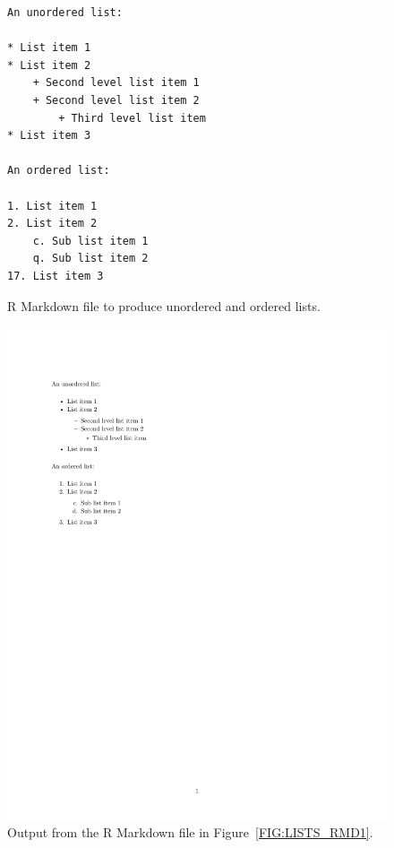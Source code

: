 \documentclass[12pt,oneside]{book}\usepackage[]{graphicx}\usepackage[]{color}
\begin{document}
\begin{figure}[!ht]
\centering
\begin{minipage}{0.45\textwidth}
\centering
\begin{verbatim}
An unordered list:

* List item 1
* List item 2
    + Second level list item 1
    + Second level list item 2
        + Third level list item
* List item 3

An ordered list:

1. List item 1
2. List item 2
    c. Sub list item 1
    q. Sub list item 2
17. List item 3
\end{verbatim}
\caption{R Markdown file to produce unordered and ordered lists.}
\label{FIG:LISTS_RMD1}
\end{minipage}\hfill
\begin{minipage}{0.45\textwidth}
\centering
\includegraphics{03-rMarkdown/03-images/ListExamples.pdf}
\caption{Output from the R Markdown file in Figure~\ref{FIG:LISTS_RMD1}.}
\label{FIG:LISTS_RMD2}
\end{minipage}
\end{figure}
\end{document}
